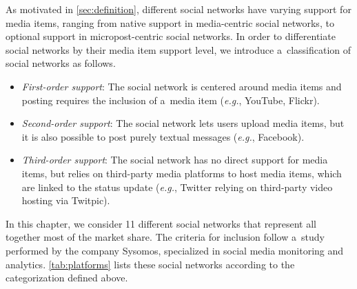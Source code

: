 {As motivated in \autoref{sec:definition},
different social networks have varying support
for media items, ranging from native support
in media-centric social networks,
to optional support in micropost-centric social networks.
In order to differentiate social networks by their
media item support level,
we introduce a~classification of social networks as follows.

\begin{itemize}
  \item \emph{First-order support}:
        The social network is centered around media items
        and posting requires the inclusion of a~media item
        (\emph{e.g.}, YouTube, Flickr).
  \item \emph{Second-order support}:
        The social network lets users upload media items,
        but it is also possible to post purely textual messages
        (\emph{e.g.}, Facebook).
  \item \emph{Third-order support}:
        The social network has no direct support for media items,
        but relies on third-party media platforms
        to host media items, which are linked to the status update
        (\emph{e.g.}, Twitter relying on third-party video hosting via Twitpic).
\end{itemize}

In this chapter, we consider 11 different social networks
that represent all together most of the market share.
The criteria for inclusion follow
a~study~\cite{levine2011howpeopleshare}
performed by the company Sysomos, specialized in social media
monitoring and analytics.
\autoref{tab:platforms} lists these social networks according to the categorization defined above.

}
